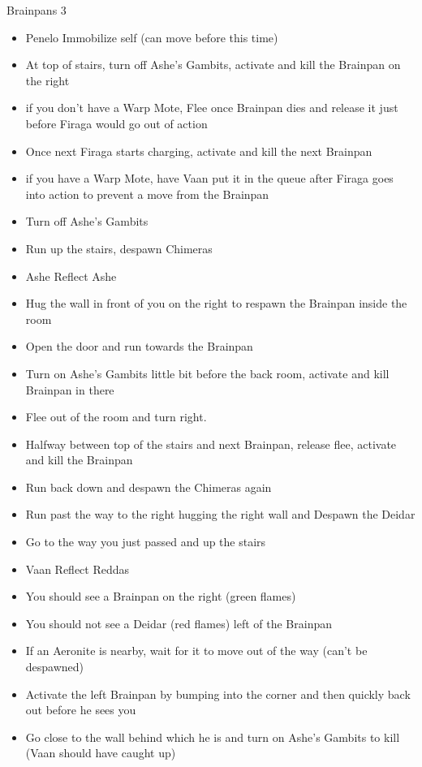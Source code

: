 \begin{battle}{Brainpans 3}
\begin{itemize}
	\item  Penelo Immobilize self (can move before this time)
	\item  At top of stairs, turn off Ashe's Gambits, activate and kill the Brainpan on the right
		\item  if you don't have a Warp Mote, Flee once Brainpan dies and release it just before Firaga would go out of action
	\item  Once next Firaga starts charging, activate and kill the next Brainpan
		\item  if you have a Warp Mote, have Vaan put it in the queue after Firaga goes into action to prevent a move from the Brainpan
	\item  Turn off Ashe's Gambits
	\item  Run up the stairs, despawn Chimeras
	\item  Ashe Reflect Ashe
	\item  Hug the wall in front of you on the right to respawn the Brainpan inside the room
	\item  Open the door and run towards the Brainpan
	\item  Turn on Ashe's Gambits little bit before the back room, activate and kill Brainpan in there
	\item  Flee out of the room and turn right.
	\item  Halfway between top of the stairs and next Brainpan, release flee, activate and kill the Brainpan
	\item  Run back down and despawn the Chimeras again
	\item  Run past the way to the right hugging the right wall and Despawn the Deidar
	\item  Go to the way you just passed and up the stairs
		\item  Vaan Reflect Reddas
		\item  You should see a Brainpan on the right (green flames)
		\item  You should not see a Deidar (red flames) left of the Brainpan
		\item  If an Aeronite is nearby, wait for it to move out of the way (can't be despawned)
	\item  Activate the left Brainpan by bumping into the corner and then quickly back out before he sees you
	\item  Go close to the wall behind which he is and turn on Ashe's Gambits to kill (Vaan should have caught up)

\end{itemize}
\end{battle}
